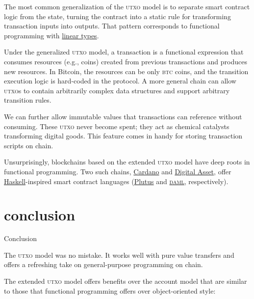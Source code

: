 \documentclass{article}
\begin{document}
The most common generalization of the \textsc{utxo} model is to separate smart contract logic from the state,
turning the contract into a static rule for transforming transaction inputs into outputs.
That pattern corresponds to functional programming with \href{https://en.wikipedia.org/wiki/Substructural_type_system#Linear_type_systems}{linear types}.

Under the generalized \textsc{utxo} model,
a transaction is a functional expression that consumes resources (e.g., coins) created from previous transactions and produces new resources.
In Bitcoin, the resources can be only \textsc{btc} coins,
and the transition execution logic is hard-coded in the protocol.
A more general chain can allow \textsc{utxo}s to contain arbitrarily complex data structures and support arbitrary transition rules.

We can further allow immutable values that transactions can reference without consuming.
These \textsc{utxo} never become spent; they act as chemical catalysts transforming digital goods.
This feature comes in handy for storing transaction scripts on chain.

Unsurprisingly, blockchains based on the extended \textsc{utxo} model have deep roots in functional programming.
Two such chains, \href{https://cardano.org/}{Cardano} and \href{https://www.digitalasset.com/}{Digital Asset},
offer \href{https://www.haskell.org/}{Haskell}-inspired smart contract languages
(\href{https://developers.cardano.org/docs/smart-contracts/plutus/}{Plutus} and \href{https://github.com/digital-asset/daml}{\textsc{daml}}, respectively).


\section{conclusion}{Conclusion}

The \textsc{utxo} model was no mistake.
It works well with pure value transfers and offers a refreshing take on general-purpose programming on chain.

The extended \textsc{utxo} model offers benefits over the account model
that are similar to those that functional programming offers over object-oriented style:
\end{document}
